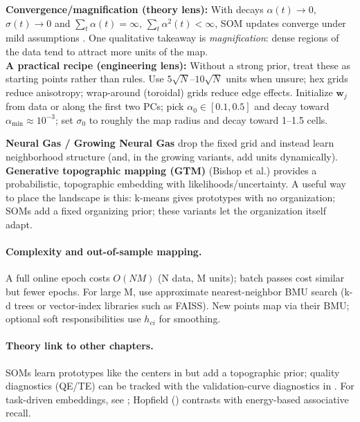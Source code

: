 \begin{tcolorbox}[summarybox, title={Theory notes and recipes}]
\textbf{Convergence/magnification (theory lens):} With decays \(\alpha(t)\to 0\), \(\sigma(t)\to 0\) and \(\sum_t \alpha(t)=\infty\), \(\sum_t \alpha^2(t)<\infty\), SOM updates converge under mild assumptions \citep{ErwinObermayerSchulten1992,CottrellFort1986}. One qualitative takeaway is \emph{magnification}: dense regions of the data tend to attract more units of the map.\\
\textbf{A practical recipe (engineering lens):} Without a strong prior, treat these as starting points rather than rules. Use \(5\sqrt{N}\)--\(10\sqrt{N}\) units when unsure; hex grids reduce anisotropy; wrap-around (toroidal) grids reduce edge effects. Initialize \(\mathbf{w}_j\) from data or along the first two PCs; pick \(\alpha_0\in[0.1,0.5]\) and decay toward \(\alpha_{\min}\approx 10^{-3}\); set \(\sigma_0\) to roughly the map radius and decay toward 1--1.5 cells.
\end{tcolorbox}

\begin{tcolorbox}[summarybox, title={Related and growing variants}]
\textbf{Neural Gas / Growing Neural Gas} \citep{MartinetzBerkovichSchulten1993,Fritzke1994GrowingNeuralGas} drop the fixed grid and instead learn neighborhood structure (and, in the growing variants, add units dynamically). \textbf{Generative topographic mapping (GTM)} (Bishop et al.) provides a probabilistic, topographic embedding with likelihoods/uncertainty. A useful way to place the landscape is this: k-means gives prototypes with no organization; SOMs add a fixed organizing prior; these variants let the organization itself adapt.
\end{tcolorbox}

\paragraph{Complexity and out-of-sample mapping.} A full online epoch costs \(O(NM)\) (N data, M units); batch passes cost similar but fewer epochs. For large M, use approximate nearest-neighbor BMU search (k-d trees or vector-index libraries such as FAISS). New points map via their BMU; optional soft responsibilities use \(h_{ci}\) for smoothing.
\paragraph{Theory link to other chapters.} SOMs learn prototypes like the centers in  but add a topographic prior; quality diagnostics (QE/TE) can be tracked with the validation-curve diagnostics in . For task-driven embeddings, see ; Hopfield () contrasts with energy-based associative recall.

